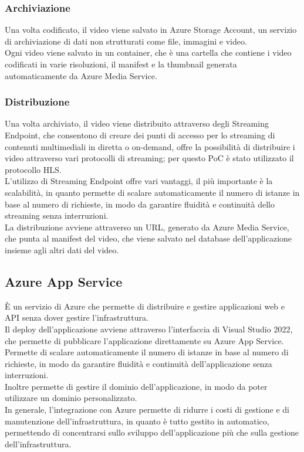 \subsubsection{Archiviazione}
Una volta codificato, il video viene salvato in Azure Storage Account, un servizio di archiviazione di dati non strutturati come file, immagini e video.\\
Ogni video viene salvato in un container, che è una cartella che contiene i video codificati in varie risoluzioni, il manifest e la thumbnail generata automaticamente da Azure Media Service.\\

\subsubsection{Distribuzione}
Una volta archiviato, il video viene distribuito attraverso degli Streaming Endpoint, che consentono di creare dei punti di accesso per lo streaming di contenuti multimediali in diretta o on-demand, offre la possibilità di distribuire i video attraverso vari protocolli di streaming; per questo PoC è stato utilizzato il protocollo HLS.\\
L'utilizzo di Streaming Endpoint offre vari vantaggi, il più importante è la scalabilità, in quanto permette di scalare automaticamente il numero di istanze in base al numero di richieste, in modo da garantire fluidità e continuità dello streaming senza interruzioni.\\
La distribuzione avviene attraverso un URL, generato da Azure Media Service, che punta al manifest del video, che viene salvato nel database dell'applicazione insieme agli altri dati del video.\\


\subsection{Azure App Service}
È un servizio di Azure che permette di distribuire e gestire applicazioni web e API senza dover gestire l'infrastruttura.\\
Il deploy dell'applicazione avviene attraverso l'interfaccia di Visual Studio 2022, che permette di pubblicare l'applicazione direttamente su Azure App Service.\\
Permette di scalare automaticamente il numero di istanze in base al numero di richieste, in modo da garantire fluidità e continuità dell'applicazione senza interruzioni.\\
Inoltre permette di gestire il dominio dell'applicazione, in modo da poter utilizzare un dominio personalizzato.\\

In generale, l'integrazione con Azure permette di ridurre i costi di gestione e di manutenzione dell'infrastruttura, in quanto è tutto gestito in automatico, permettendo di concentrarsi sullo sviluppo dell'applicazione più che sulla gestione dell'infrastruttura.\\